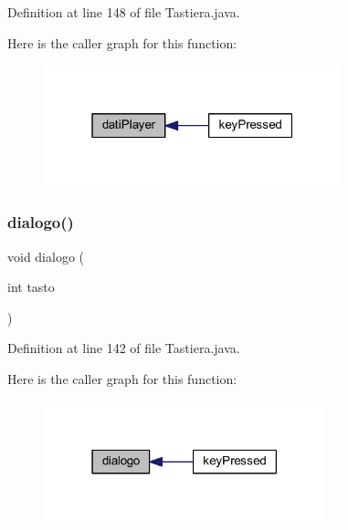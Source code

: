 Definition at line 148 of file Tastiera.\+java.

Here is the caller graph for this function\+:
\nopagebreak
\begin{figure}[H]
\begin{center}
\leavevmode
\includegraphics[width=244pt]{classa_1_1survival_1_1game_1_1_tastiera_afdd8d3c804439a86dbe018e7b23878f1_icgraph}
\end{center}
\end{figure}
\mbox{\label{classa_1_1survival_1_1game_1_1_tastiera_a511fbdea77021f4250410b5565a4a663}} 
\subsubsection{\texorpdfstring{dialogo()}{dialogo()}}
{\footnotesize\ttfamily void dialogo (\begin{DoxyParamCaption}\item[{int}]{tasto }\end{DoxyParamCaption})}



Definition at line 142 of file Tastiera.\+java.

Here is the caller graph for this function\+:
\nopagebreak
\begin{figure}[H]
\begin{center}
\leavevmode
\includegraphics[width=231pt]{classa_1_1survival_1_1game_1_1_tastiera_a511fbdea77021f4250410b5565a4a663_icgraph}
\end{center}
\end{figure}
\mbox{\label{classa_1_1survival_1_1game_1_1_tastiera_a6e3f5b499ce8fa385ff315cd3115e6b7}} 
